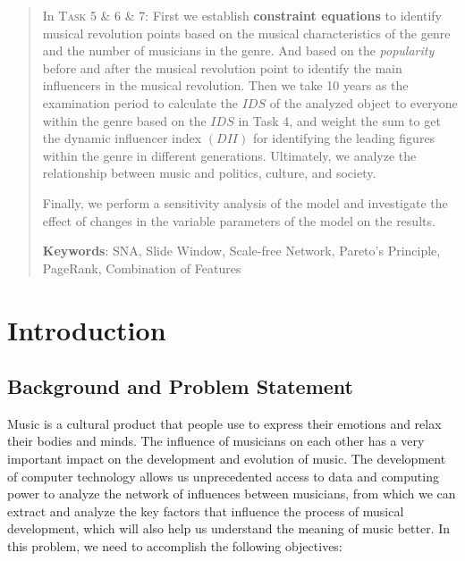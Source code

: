 \documentclass[12pt]{article}  %
\begin{document}
\begin{abstract}
In \textsc{Task 5 \& 6 \& 7:} First we establish \textbf{constraint equations} to identify musical revolution points based on the musical characteristics of the genre and the number of musicians in the genre. And based on the \emph{popularity} before and after the musical revolution point to identify the main influencers in the musical revolution. Then we take 10 years as the examination period to calculate the $IDS$ of the analyzed object to everyone within the genre based on the $IDS$ in Task 4, and weight the sum to get the dynamic influencer index $(DII)$ for identifying the leading figures within the genre in different generations. Ultimately, we analyze the relationship between music and politics, culture, and society.

Finally, we perform a sensitivity analysis of the model and investigate the effect of changes in the variable parameters of the model on the results.

     \noindent\textbf{Keywords}: SNA, Slide Window, Scale-free Network, Pareto's Principle, PageRank, Combination of Features

\end{abstract}

\maketitle  %
\tableofcontents  %


\section{Introduction}
\vspace{-0.5cm}
\subsection{Background and Problem Statement}
\vspace{-0.2cm}
Music is a cultural product that people use to express their emotions and relax their bodies and minds. The influence of musicians on each other has a very important impact on the development and evolution of music. The development of computer technology allows us unprecedented access to data and computing power to analyze the network of influences between musicians, from which we can extract and analyze the key factors that influence the process of musical development, which will also help us understand the meaning of music better. In this problem, we need to accomplish the following objectives:
\end{document}
